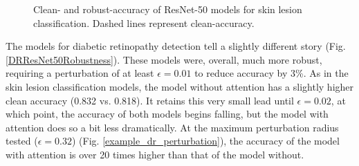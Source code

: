 \documentclass[10pt,twocolumn,letterpaper]{article}
\begin{document}
      \begin{figure}[h!]
        \caption{Clean- and robust-accuracy of ResNet-50 models for skin lesion classification.  Dashed lines represent clean-accuracy.}
        \label{DermResNet50Robustness}
      \end{figure}

      The models for diabetic retinopathy detection tell a slightly different story (Fig. \ref{DRResNet50Robustness}). These models were, overall, much more robust, requiring a perturbation of at least $\epsilon=0.01$ to reduce accuracy by 3\%. As in the skin lesion classification models, the model without attention has a slightly higher clean accuracy (0.832 vs. 0.818). It retains this very small lead until $\epsilon=0.02$, at which point, the accuracy of both models begins falling, but the model with attention does so a bit less dramatically. At the maximum perturbation radius tested ($\epsilon=0.32$) (Fig. \ref{example_dr_perturbation}), the accuracy of the model with attention is over 20 times higher than that of the model without.
\end{document}

